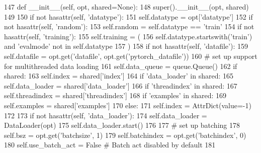 \begin{DoxyCode}
147     \textcolor{keyword}{def }\_\_init\_\_(self, opt, shared=None):
148         super().\_\_init\_\_(opt, shared)
149 
150         \textcolor{keywordflow}{if} \textcolor{keywordflow}{not} hasattr(self, \textcolor{stringliteral}{'datatype'}):
151             self.datatype = opt[\textcolor{stringliteral}{'datatype'}]
152         \textcolor{keywordflow}{if} \textcolor{keywordflow}{not} hasattr(self, \textcolor{stringliteral}{'random'}):
153             self.random = self.datatype == \textcolor{stringliteral}{'train'}
154         \textcolor{keywordflow}{if} \textcolor{keywordflow}{not} hasattr(self, \textcolor{stringliteral}{'training'}):
155             self.training = (
156                 self.datatype.startswith(\textcolor{stringliteral}{'train'}) \textcolor{keywordflow}{and} \textcolor{stringliteral}{'evalmode'} \textcolor{keywordflow}{not} \textcolor{keywordflow}{in} self.datatype
157             )
158         \textcolor{keywordflow}{if} \textcolor{keywordflow}{not} hasattr(self, \textcolor{stringliteral}{'datafile'}):
159             self.datafile = opt.get(\textcolor{stringliteral}{'datafile'}, opt.get(\textcolor{stringliteral}{'pytorch\_datafile'}))
160         \textcolor{comment}{# set up support for multithreaded data loading}
161         self.data\_queue = queue.Queue()
162         \textcolor{keywordflow}{if} shared:
163             self.index = shared[\textcolor{stringliteral}{'index'}]
164             \textcolor{keywordflow}{if} \textcolor{stringliteral}{'data\_loader'} \textcolor{keywordflow}{in} shared:
165                 self.data\_loader = shared[\textcolor{stringliteral}{'data\_loader'}]
166             \textcolor{keywordflow}{if} \textcolor{stringliteral}{'threadindex'} \textcolor{keywordflow}{in} shared:
167                 self.threadindex = shared[\textcolor{stringliteral}{'threadindex'}]
168             \textcolor{keywordflow}{if} \textcolor{stringliteral}{'examples'} \textcolor{keywordflow}{in} shared:
169                 self.examples = shared[\textcolor{stringliteral}{'examples'}]
170         \textcolor{keywordflow}{else}:
171             self.index = AttrDict(value=-1)
172 
173         \textcolor{keywordflow}{if} \textcolor{keywordflow}{not} hasattr(self, \textcolor{stringliteral}{'data\_loader'}):
174             self.data\_loader = DataLoader(opt)
175             self.data\_loader.start()
176 
177         \textcolor{comment}{# set up batching}
178         self.bsz = opt.get(\textcolor{stringliteral}{'batchsize'}, 1)
179         self.batchindex = opt.get(\textcolor{stringliteral}{'batchindex'}, 0)
180         self.use\_batch\_act = \textcolor{keyword}{False}  \textcolor{comment}{# Batch act disabled by default}
181 
\end{DoxyCode}


